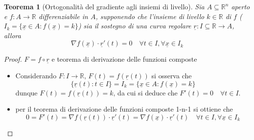 \documentclass[12pt, a4paper]{article}
\theoremstyle{break}
\newtheorem{theorem}{Teorema} %
\begin{document}
\newpage
\begin{theorem} [Ortogonalità del gradiente agli insiemi di livello]
	Sia $A \subseteq \mathbb{R}^n$ aperto e $f: A \to \mathbb{R}$
	differenziabile in $A$, supponendo che l'insieme di livello $k \in
		\mathbb{R}$ di $f$ ($I_k = \{\underline{x} \in A: f(\underline{x}) = k
		\}$) sia il sostegno di una curva regolare $\underline{r}: I \subseteq
		\mathbb{R} \to A$, allora
	\[
		\nabla f(\underline{x}) \cdot \underline{r}'(t) = 0 \quad \forall t \in
		I , \forall \underline{x} \in I_k
	\]
\end{theorem}
\begin{proof} $F = f \circ \underline{r}$ e teorema di derivazione
	delle funzioni composte
	\begin{itemize}
		\item Considerando $F:I \to \mathbb{R}$, $F(t) = f(\underline{r}(t))$
		      si osserva che
		      \[
			      \{\underline{r}(t): t \in I\} = I_k = \{\underline{x} \in A:
			      f(\underline{x}) = k \}
		      \]
		      dunque $F(t) = f(\underline{r}(t)) = k$, da cui si deduce che
		      $F'(t) = 0 \quad \forall t \in I$.
		\item per il teorema di derivazione delle funzioni composte 1-n-1 si
		      ottiene che
		      \[
			      0 = F'(t) = \nabla f(\underline{r}(t)) \cdot \underline{r}'(t) =
			      \nabla f(\underline{x}) \cdot \underline{r}'(t) \quad \forall t
			      \in I , \forall \underline{x} \in I_k
		      \]
	\end{itemize}
\end{proof}
\end{document}
